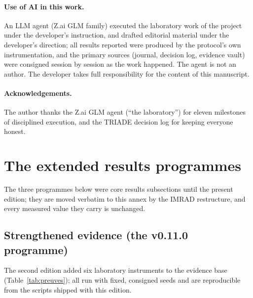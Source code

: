 \documentclass[10pt,a4paper]{article}
\begin{document}
\paragraph{Use of AI in this work.} An LLM agent (Z.ai GLM family)
executed the laboratory work of the project under the developer's
instruction, and drafted editorial material under the developer's
direction; all results reported were produced by the protocol's own
instrumentation, and the primary sources (journal, decision log,
evidence vault) were consigned session by session as the work happened.
The agent is not an author. The developer takes full responsibility for
the content of this manuscript.

\paragraph{Acknowledgements.} The author thanks the Z.ai GLM agent
(``the laboratory'') for eleven milestones of disciplined execution, and
the TRIADE decision log for keeping everyone honest.


\appendix
\section{The extended results programmes}\label{sec:renforce-annexe}
The three programmes below were core results subsections until the
present edition; they are moved verbatim to this annex by the IMRAD
restructure, and every measured value they carry is unchanged.

\subsection{Strengthened evidence (the v0.11.0 programme)}\label{sec:renforce}

The second edition added six laboratory instruments to the evidence base
(Table~\ref{tab:preuves}); all run with fixed, consigned seeds and are
reproducible from the scripts shipped with this edition.
\end{document}

